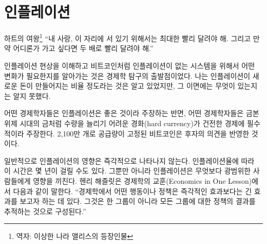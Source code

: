 \chapter{인플레이션}
\label{les:9}

\begin{chapquote}{하트의 여왕\footnote{역자: 이상한 나라 앨리스의 등장인물}} 
\enquote{내 사랑, 이 자리에 서 있기 위해서는 최대한 빨리 달려야 해. 그리고 만약 어디론가 가고 싶다면
두 배로 빨리 달려야 해.}
\end{chapquote}

인플레이션 현상을 이해하고 
비트코인처럼 인플레이션이 없는 시스템을 위해서
어떤 변화가 필요한지를 알아가는 것은 경제학 탐구의 출발점이었다. 
나는 인플레이션이 새로운 돈이 만들어지는 비율 정도라는 것은 알고 있었지만,
그 이면에는 무엇이 있는지는 알지 못했다.

어떤 경제학자들은 인플레이션은 좋은 것이라 주장하는 반면, 
어떤 경제학자들은 금본위제 시대의 금처럼 
수량을 늘리기 어려운 경화(hard currency)가 건전한 경제에 필수적이라 주장한다. 
2,100만 개로 공급량이 고정된 비트코인은 후자의 의견을 반영한 것이다.

일반적으로 인플레이션의 영향은 즉각적으로 나타나지 않는다. 
인플레이션율에 따라 이 시간은 몇 년이 걸릴 수도 있다. 
그뿐만 아니라 인플레이션은 무엇보다 광범위한 사람들에게 영향을 끼친다. 
헨리 해즐릿은 경제학의 교훈(Economics in One Lesson)에서 다음과 같이 말한다. 
\enquote{경제학에서 어떤 행동이나 정책은 즉각적인 효과보다는 긴 효과를 보고자 하는 데 있다.
그것은 한 그룹이 아니라 모든 그룹에 대한 정책의 결과를 추적하는 것으로 구성된다.}


